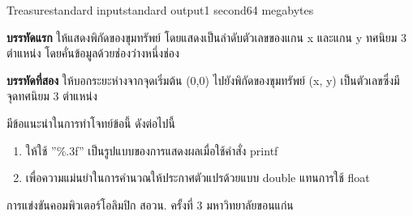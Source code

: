 \documentclass[11pt,a4paper]{article}
\begin{document}
\begin{problem}{Treasure}{standard input}{standard output}{1 second}{64 megabytes}
\OutputFile

\textbf{บรรทัดแรก} ให้แสดงพิกัดของขุมทรัพย์ โดยแสดงเป็นลำดับตัวเลขของแกน x และแกน y ทศนิยม 3 ตำแหน่ง โดยคั่นข้อมูลด้วยช่องว่างหนึ่งช่อง

\textbf{บรรทัดที่สอง} ให้บอกระยะห่างจากจุดเริ่มต้น (0,0) ไปยังพิกัดของขุมทรัพย์ (x, y) เป็นตัวเลขซึ่งมีจุดทศนิยม 3 ตำแหน่ง

\Examples

\begin{example}
%
\end{example}

\Note 

มีข้อแนะนำในการทำโจทย์ข้อนี้ ดังต่อไปนี้
\begin{enumerate}

\item ให้ใช้ ”\%.3f” เป็นรูปแบบของการแสดงผลเมื่อใช้คำสั่ง printf
\item เพื่อความแม่นยำในการคำนวณให้ประกาศตัวแปรด้วยแบบ double แทนการใช้ float
\end{enumerate}

\Source

การแข่งขันคอมพิวเตอร์โอลิมปิก สอวน. ครั้งที่ 3 มหาวิทยาลัยขอนแก่น

\end{problem}
\end{document}
